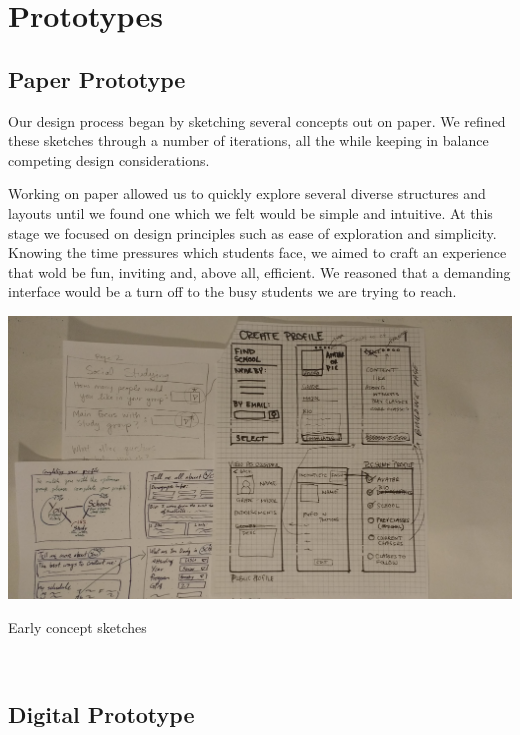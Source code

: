 \documentclass{sigchi-ext}
\begin{document}
\section{Prototypes}

\subsection{Paper Prototype}

Our design process began by sketching several concepts out on paper. We refined
these sketches through a number of iterations, all the while keeping in balance
competing design considerations.

Working on paper allowed us to quickly explore several diverse structures and
layouts until we found one which we felt would be simple and intuitive. At this
stage we focused on design principles such as ease of exploration and simplicity.
Knowing the time pressures which students face, we aimed to craft an experience
that wold be fun, inviting and, above all, efficient. We reasoned that a
demanding interface would be a turn off to the busy students we are trying to
reach.

\begin{marginfigure}[3pc]
  \begin{minipage}{\marginparwidth}
    \centering
	  \includegraphics[width=0.7\marginparwidth]{figures/paper_prototype.jpg}
    \caption{Early concept sketches}~\label{fig:marginfig}
  \end{minipage}
\end{marginfigure}



\subsection{Digital Prototype}
\end{document}
